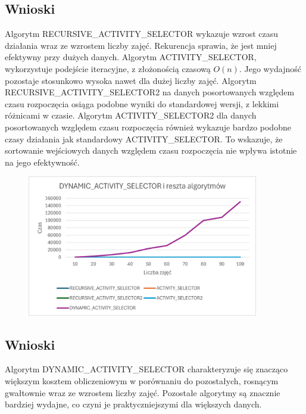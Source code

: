 \documentclass{article}
\begin{document}
		\subsection*{Wnioski} 
		Algorytm RECURSIVE\_ACTIVITY\_SELECTOR wykazuje wzrost czasu działania wraz ze wzrostem liczby zajęć. Rekurencja sprawia, że jest mniej efektywny przy dużych danych.
		Algorytm ACTIVITY\_SELECTOR, wykorzystuje podejście iteracyjne, z złożonością czasową $O(n)$. Jego wydajność pozostaje stosunkowo wysoka nawet dla dużej liczby zajęć. Algorytm RECURSIVE\_ACTIVITY\_SELECTOR2 na danych posortowanych względem czasu rozpoczęcia osiąga podobne wyniki do standardowej wersji, z lekkimi różnicami w czasie. Algorytm ACTIVITY\_SELECTOR2 dla danych posortowanych względem czasu rozpoczęcia również wykazuje bardzo podobne czasy działania jak standardowy ACTIVITY\_SELECTOR. To wskazuje, że sortowanie wejściowych danych względem czasu rozpoczęcia nie wpływa istotnie na jego efektywność. 
		
		\begin{figure}[H]
			\centering
			\includegraphics[width=0.9\textwidth]{DASiR.png}
		\end{figure}
		
		\subsection*{Wnioski} 
		Algorytm DYNAMIC\_ACTIVITY\_SELECTOR charakteryzuje się znacząco większym kosztem obliczeniowym w porównaniu do pozostałych, rosnącym gwałtownie wraz ze wzrostem liczby zajęć. Pozostałe algorytmy są znacznie bardziej wydajne, co czyni je praktyczniejszymi dla większych danych.
\end{document}
